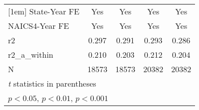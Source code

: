 {\begin{tabular}{l*{4}{c}}
[1em]
State-Year FE&         Yes         &         Yes         &         Yes         &         Yes         \\
[1em]
NAICS4-Year FE&         Yes         &         Yes         &         Yes         &         Yes         \\
\hline
r2          &       0.297         &       0.291         &       0.293         &       0.286         \\
r2\_a\_within &       0.210         &       0.203         &       0.212         &       0.204         \\
N           &       18573         &       18573         &       20382         &       20382         \\
\hline\hline
\multicolumn{5}{l}{\footnotesize \textit{t} statistics in parentheses}\\
\multicolumn{5}{l}{\footnotesize \sym{*} \(p<0.05\), \sym{**} \(p<0.01\), \sym{***} \(p<0.001\)}\\
\end{tabular}
}
